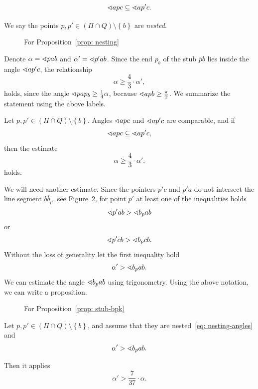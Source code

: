 \begin{equation}
\label{eq: nesting-angles}
\sphericalangle{apc} \subseteq \sphericalangle{ap'c}.
\end{equation}

We say the points $p,p' \in \left(\Pi \cap Q\right) \setminus \left\{ b \right\}$ are \textit{nested}.

\begin{figure}
\begin{center}

\end{center}
\caption{For Proposition~\ref{prop: nesting}}
\label{fig: first-relationship}
\end{figure}

Denote $\alpha = \sphericalangle{pab}$ and $\alpha' = \sphericalangle{p'ab}$. Since the end $p_{b}$ of the stub $\overline{p}b$ lies inside the angle $\sphericalangle{ap'c}$, the relationship
$$
\alpha \geq \frac{4}{3} \cdot \alpha',
$$
holds, since the angle $\sphericalangle{pap_{b}} \geq \frac{1}{4}\alpha$, because $\sphericalangle{apb} \geq \frac{\pi}{2}$. We summarize the statement using the above labels.

\begin{proposition} %
\label{prop: nesting}
Let $p,p' \in  \left(\Pi \cap Q\right) \setminus \left\{ b \right\}$. Angles $\sphericalangle{apc}$ and $\sphericalangle{ap'c}$ are comparable, and if
$$\sphericalangle{apc} \subseteq \sphericalangle{ap'c},$$
then the estimate
$$
  \alpha \geq \frac{4}{3} \cdot \alpha'.
$$
holds.
\end{proposition}

We will need another estimate. Since the pointers $\overline{p'}c$ and $\overline{p'}a$ do not intersect the line segment $\overline{bb_{p}}$, see Figure~\ref{fig: second-relationship}, for point $p'$ at least one of the inequalities holds
$$
  \sphericalangle{p'ab} > \sphericalangle{b_{p}ab}
$$
or
$$
  \sphericalangle{p'cb} > \sphericalangle{b_{p}cb}.
$$
Without the loss of generality let the first inequality hold
$$
  \alpha' > \sphericalangle{b_{p}ab}.
$$
We can estimate the angle $\sphericalangle{b_{p}ab}$ using trigonometry. Using the above notation, we can write a proposition.

\begin{figure}
\begin{center}

\end{center}
\caption{For Proposition~\ref{prop: stub-bpk}}
\label{fig: second-relationship}
\end{figure}

\begin{proposition}
\label{prop: stub-bpk}
Let $p,p' \in  \left(\Pi \cap Q\right) \setminus \left\{ b \right\}$, and assume that they are nested~\eqref{eq: nesting-angles} and
$$
  \alpha' > \sphericalangle{b_{p}ab}.
$$

Then it applies
$$
  \alpha' > \frac{7}{37} \cdot \alpha.
$$
\end{proposition}

